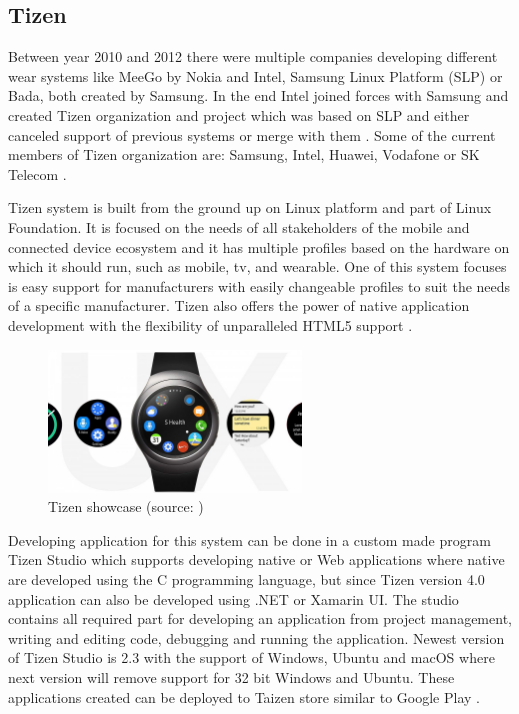 \subsection{Tizen}\label{sec:Tizen}
Between year 2010 and 2012 there were multiple companies developing different wear systems like MeeGo by Nokia and Intel, Samsung Linux Platform (SLP) or Bada, both created by Samsung. In the end Intel joined forces with Samsung and created Tizen organization and project which was based on SLP and either canceled support of previous systems or merge with them \cite{TOSBHR}. Some of the current members of Tizen organization are: Samsung, Intel, Huawei, Vodafone or SK Telecom \cite{TizenM}.

Tizen system is built from the ground up on Linux platform and part of Linux Foundation. It is focused on the needs of all stakeholders of the mobile and connected device ecosystem and it has multiple profiles based on the hardware on which it should run, such as mobile, tv, and wearable. One of this system focuses is easy support for manufacturers with easily changeable profiles to suit the needs of a specific manufacturer. Tizen also offers the power of native application development with the flexibility of unparalleled HTML5 support \cite{TizenAbout}.

\begin{figure}[H]
	\begin{centering}
		\includegraphics[width=0.6\textwidth]{img/tizen}
		\par\end{centering}
	\caption{Tizen showcase (source: \cite{NFFAWSW})\label{fig:Tizen}}
	\label{fig05c04}
\end{figure}

Developing application for this system can be done in a custom made program Tizen Studio which supports developing native or Web applications where native are developed using the C programming language, but since Tizen version 4.0 application can also be developed using .NET or Xamarin UI. The studio contains all required part for developing an application from project management, writing and editing code, debugging and running the application. Newest version of Tizen Studio is 2.3 with the support of Windows, Ubuntu and macOS where next version will remove support for 32 bit Windows and Ubuntu. These applications created can be deployed to Taizen store similar to Google Play \cite{TizenDev}.

